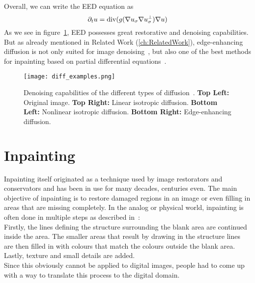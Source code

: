 \noindent Overall, we can write the EED equation as
\begin{equation}
    \partial_t u = \operatorname{div}(g(\mathbf{\nabla} u_\sigma\mathbf{\nabla} u_\sigma^\bot)\mathbf{\nabla} u)\label{def:EED}
\end{equation}
As we see in figure~\ref{fig:DiffExamples}, EED possesses great restorative and denoising
capabilities. But as already mentioned in Related Work (\ref{ch:RelatedWork}), edge-enhancing
diffusion is not
only suited for image denoising~\cite{galic05, weickert96}, but also one of the best methods for inpainting based on partial
differential equations~\cite{schmaltz09, galic08, schmaltz14}.
\begin{figure}[H]
    \centering
    \texttt{[image: diff\_examples.png]}
    \caption{Denoising capabilities of the different types of diffusion~\cite{weickert96}. \textbf{Top Left:} Original
        image. \textbf{Top Right:} Linear isotropic diffusion. \textbf{Bottom Left:} Nonlinear
    isotropic diffusion. \textbf{Bottom Right:} Edge-enhancing diffusion.}\label{fig:DiffExamples}
\end{figure}

\section{Inpainting}\label{sec:Inpainting}
Inpainting itself originated as a technique used by image restorators and conservators and has
been in use for many decades, centuries even. The main objective of inpainting is
to restore damaged regions in an image or even filling in areas that are missing
completely. In the analog or physical world, inpainting is often done in multiple steps as
described in~\cite{bertalmio00}:\\
Firstly, the lines defining the structure surrounding the blank area are continued inside the area.
The smaller areas that result by drawing in the structure lines are then filled in with colours that
match the colours outside the blank area.
Lastly, texture and small details are added.\\
Since this obviously cannot be applied to digital images, people had to come up with a way to
translate this process to the digital domain.

